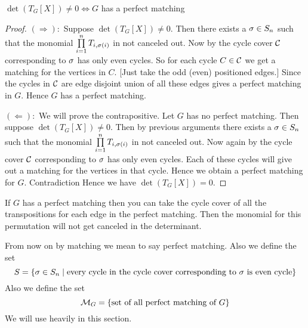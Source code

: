 \begin{theorem}[Tutte]
	$\det(T_G[X])\neq 0\iff G$ has a perfect matching
\end{theorem}
\begin{proof}
	$(\Rightarrow):$ Suppose $\det(T_G[X])\neq 0$. Then there exists a $\sigma\in S_n$ such that the monomial $\prod\limits_{i=1}^nT_{i,\sigma(i)}$ in not canceled out. Now by  the cycle cover $\mathcal{C}$ corresponding to $\sigma$ has only even cycles. So for each cycle $C\in \mathcal{C}$ we get a matching for the vertices in $C$. [Just take the odd (even) positioned edges.] Since the cycles in $\mathcal{C}$ are edge disjoint union of all these edges gives a perfect matching in $G$. Hence $G$ has a perfect matching.
	
	$(\Leftarrow):$ We will prove the contrapositive. Let $G$
	 has no perfect matching. Then suppose $\det(T_G[X])\neq 0$. Then by previous arguments there exists a $\sigma\in S_n$ such that the monomial $\prod\limits_{i=1}^nT_{i,\sigma(i)}$ in not canceled out. Now again by  the cycle cover $\mathcal{C}$ corresponding to $\sigma$ has only even cycles. Each of these cycles will give out a matching for the vertices in that cycle. Hence we obtain a perfect matching for $G$. Contradiction \ctr Hence we have $\det(T_G[X])=0$. 
\end{proof}

If $G$ has a perfect matching then you can take the cycle cover of all the transpositions for each edge in the perfect matching. Then the monomial for this permutation will not get canceled in the determinant. 

\begin{remark}
	From now on by matching we mean to say perfect matching. Also we define the set $$S=\{\sigma\in S_n\mid \text{every cycle in the cycle cover corresponding to  $\sigma$ is even cycle}\}$$Also we define the set $$\mathcal{M}_G=\{\text{set of all perfect matching of $G$}\}$$We will use heavily in this section. 
\end{remark}
